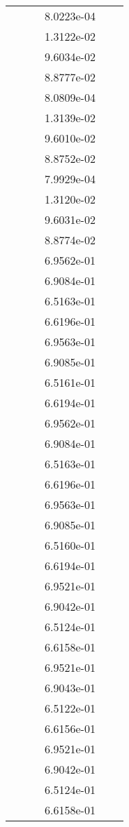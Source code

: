 \begin{xltabular}{\textwidth}{r|rS[table-format=1.3e+2]S[table-format=1.4e+2]S[table-format=1.4e+2]S[table-format=-1.5]}
&  &  & 8.0223e-04 & & \\
&  &  & 1.3122e-02 & & \\
&  &  & 9.6034e-02 & & \\
&  &  & 8.8777e-02 & & \\
&  &  & 8.0809e-04 & & \\
&  &  & 1.3139e-02 & & \\
&  &  & 9.6010e-02 & & \\
&  &  & 8.8752e-02 & & \\
&  &  & 7.9929e-04 & & \\
&  &  & 1.3120e-02 & & \\
&  &  & 9.6031e-02 & & \\
&  &  & 8.8774e-02 & & \\
&  &  & 6.9562e-01 & & \\
&  &  & 6.9084e-01 & & \\
&  &  & 6.5163e-01 & & \\
&  &  & 6.6196e-01 & & \\
&  &  & 6.9563e-01 & & \\
&  &  & 6.9085e-01 & & \\
&  &  & 6.5161e-01 & & \\
&  &  & 6.6194e-01 & & \\
&  &  & 6.9562e-01 & & \\
&  &  & 6.9084e-01 & & \\
&  &  & 6.5163e-01 & & \\
&  &  & 6.6196e-01 & & \\
&  &  & 6.9563e-01 & & \\
&  &  & 6.9085e-01 & & \\
&  &  & 6.5160e-01 & & \\
&  &  & 6.6194e-01 & & \\
&  &  & 6.9521e-01 & & \\
&  &  & 6.9042e-01 & & \\
&  &  & 6.5124e-01 & & \\
&  &  & 6.6158e-01 & & \\
&  &  & 6.9521e-01 & & \\
&  &  & 6.9043e-01 & & \\
&  &  & 6.5122e-01 & & \\
&  &  & 6.6156e-01 & & \\
&  &  & 6.9521e-01 & & \\
&  &  & 6.9042e-01 & & \\
&  &  & 6.5124e-01 & & \\
&  &  & 6.6158e-01 & & \\

\end{xltabular}
